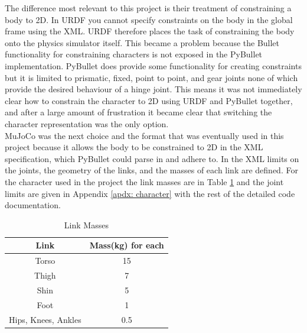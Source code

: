 \documentclass[12pt, a4paper]{article}
\begin{document}
The difference most relevant to this project is their treatment of constraining a body to 2D. In URDF you cannot specify constraints on the body in the global frame using the XML. URDF therefore places the task of constraining the body onto the physics simulator itself. This became a problem because the Bullet functionality for constraining characters is not exposed in the PyBullet implementation. PyBullet does provide some functionality for creating constraints but it is limited to prismatic, fixed, point to point, and gear joints none of which provide the desired behaviour of a hinge joint. This means it was not immediately clear how to constrain the character to 2D using URDF and PyBullet together, and after a large amount of frustration it became clear that switching the character representation was the only option.\\

MuJoCo was the next choice and the format that was eventually used in this project because it allows the body to be constrained to 2D in the XML specification, which PyBullet could parse in and adhere to. In the XML limits on the joints, the geometry of the links, and the masses of each link are defined. For the character used in the project the link masses are in Table \ref{tbl:link masses} and the joint limits are given in Appendix \ref{apdx: character} with the rest of the detailed code documentation.\\

\begin{table}[ht]
\caption{Link Masses}
\begin{center}
\begin{tabular}{|c|c|}
\hline
Link & Mass(kg) for each\\
\hline
Torso & 15\\
\hline
Thigh & 7\\
\hline
Shin  & 5\\
\hline
Foot & 1\\
\hline
Hips, Knees, Ankles & 0.5\\
\hline
\end{tabular}
\end{center}
\label{tbl:link masses}
\end{table}
\end{document}
